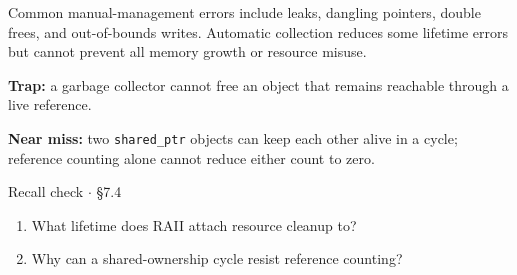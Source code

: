 \documentclass[11pt]{article}
\begin{document}
\begin{keepsection}
Common manual-management errors include leaks, dangling pointers, double frees, and out-of-bounds writes. Automatic collection reduces some lifetime errors but cannot prevent all memory growth or resource misuse.

\begin{notebox}\textbf{Trap:} a garbage collector cannot free an object that remains reachable through a live reference.\end{notebox}

\begin{notebox}\textbf{Near miss:} two \texttt{shared\_ptr} objects can keep each other alive in a cycle; reference counting alone cannot reduce either count to zero.\end{notebox}

\begin{recallbox}{Recall check \ensuremath{\cdot} §7.4}
\begin{enumerate}
\item What lifetime does RAII attach resource cleanup to?
\item Why can a shared-ownership cycle resist reference counting?
\end{enumerate}

\end{recallbox}
\end{keepsection}
\end{document}
